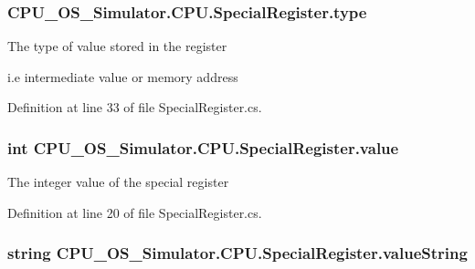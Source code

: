 \subsubsection[{type}]{ C\+P\+U\+\_\+\+O\+S\+\_\+\+Simulator.\+C\+P\+U.\+Special\+Register.\+type\hspace{0.3cm}{\ttfamily [private]}}\label{class_c_p_u___o_s___simulator_1_1_c_p_u_1_1_special_register_aae2bca6c1354013cca156bd19c30640d}




The type of value stored in the register 

i.\+e intermediate value or memory address 

Definition at line 33 of file Special\+Register.\+cs.

\hypertarget{class_c_p_u___o_s___simulator_1_1_c_p_u_1_1_special_register_a040dbed0c42c3a45ccb7b01d181dd829}{}
\subsubsection[{value}]{\setlength{\rightskip}{0pt plus 5cm}int C\+P\+U\+\_\+\+O\+S\+\_\+\+Simulator.\+C\+P\+U.\+Special\+Register.\+value\hspace{0.3cm}{\ttfamily [private]}}\label{class_c_p_u___o_s___simulator_1_1_c_p_u_1_1_special_register_a040dbed0c42c3a45ccb7b01d181dd829}


The integer value of the special register 



Definition at line 20 of file Special\+Register.\+cs.

\hypertarget{class_c_p_u___o_s___simulator_1_1_c_p_u_1_1_special_register_a540a55b17a53591312e76689d051abac}{}
\subsubsection[{value\+String}]{\setlength{\rightskip}{0pt plus 5cm}string C\+P\+U\+\_\+\+O\+S\+\_\+\+Simulator.\+C\+P\+U.\+Special\+Register.\+value\+String\hspace{0.3cm}{\ttfamily [private]}}\label{class_c_p_u___o_s___simulator_1_1_c_p_u_1_1_special_register_a540a55b17a53591312e76689d051abac}




